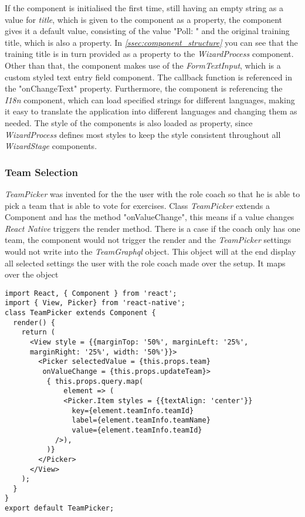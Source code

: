 If the component is initialised the first time, still having an empty string as a value for \textit{title}, which is given to the component as a property, the component gives it a default value, consisting of the value "Poll: " and the original training title, which is also a property. In \textit{\ref{ssec:component_structure} } you can see that the training title is in turn provided as a property to the \textit{WizardProcess} component.
\newline
Other than that, the component makes use of the \textit{FormTextInput}, which is a custom styled text entry field component. The callback function is referenced in the "onChangeText" property. Furthermore, the component is referencing the \textit{I18n} component, which can load specified strings for different languages, making it easy to translate the application into different languages and changing them as needed. The style of the components is also loaded as property, since \textit{WizardProcess} defines most styles to keep the style consistent throughout all \textit{WizardStage} components.

\subsubsection{Team Selection}
\label{sssec:poll_team}

\textit{TeamPicker} was invented for the the user with the role coach so that he is able to pick a team that is able to vote for exercises. Class \textit{TeamPicker} extends a Component and has the method "onValueChange", this means if a value changes \textit{React Native} triggers the render method. There is a case if the coach only has one team, the component would not trigger the render and the \textit{TeamPicker} settings would not write into the \textit{TeamGraphql} object. This object will at the end display all selected settings the user with the role coach made over the setup. It maps over the object 

\begin{lstlisting}
import React, { Component } from 'react';
import { View, Picker} from 'react-native';
class TeamPicker extends Component {
  render() {
    return (
      <View style = {{marginTop: '50%', marginLeft: '25%',
      marginRight: '25%', width: '50%'}}>
        <Picker selectedValue = {this.props.team}
         onValueChange = {this.props.updateTeam}>
          { this.props.query.map(
              element => (
              <Picker.Item styles = {{textAlign: 'center'}}
                key={element.teamInfo.teamId}
                label={element.teamInfo.teamName}
                value={element.teamInfo.teamId}
            />),
          )}
        </Picker>
      </View>
    );
  }
}
export default TeamPicker;
\end{lstlisting}


